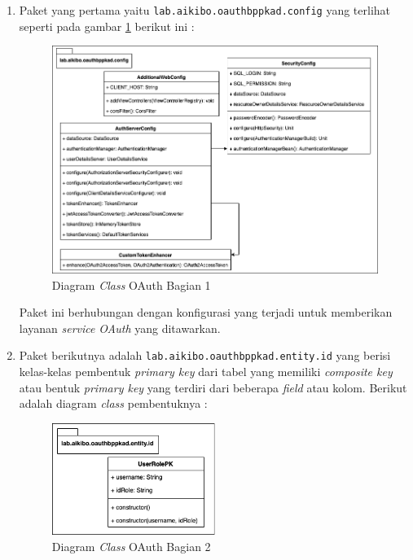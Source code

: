 \documentclass[pdftex,12pt, oneside]{article}
\begin{document}
\begin{enumerate}

	\item Paket yang pertama yaitu \texttt{lab.aikibo.oauthbppkad.config} yang terlihat seperti pada gambar \ref{fig:class-dia-oauth} berikut ini :

\begin{figure}[H]
	\centering
	\includegraphics[width=1\textwidth]{./resources/class-dia-oauth}
	\caption{Diagram \textit{Class} OAuth Bagian 1}
	\label{fig:class-dia-oauth}
\end{figure}

	Paket ini berhubungan dengan konfigurasi yang terjadi untuk memberikan layanan \textit{service} \textit{OAuth} yang ditawarkan.
	
	\item Paket berikutnya adalah \texttt{lab.aikibo.oauthbppkad.entity.id} yang berisi kelas-kelas pembentuk \textit{primary key} dari tabel yang memiliki \textit{composite key} atau bentuk \textit{primary key} yang terdiri dari beberapa \textit{field} atau kolom. Berikut adalah diagram \textit{class} pembentuknya :

\begin{figure}[H]
	\centering
	\includegraphics[width=0.5\textwidth]{./resources/class-dia-oauth-1}
	\caption{Diagram \textit{Class} OAuth Bagian 2}
	\label{fig:class-dia-oauth-1}
\end{figure}


\end{enumerate}
\end{document}
